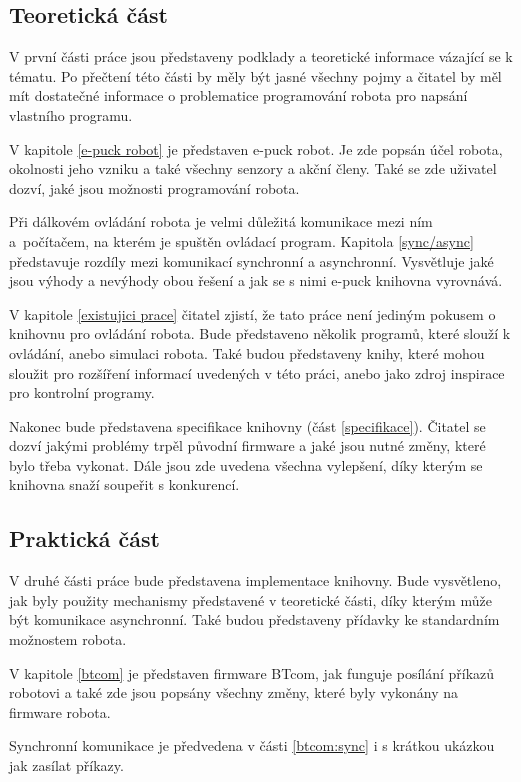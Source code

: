 \subsection*{Teoretická část}
V první části práce jsou představeny podklady a teoretické informace
vázající se k tématu. Po přečtení této části by měly být jasné všechny
pojmy a čitatel by měl mít dostatečné informace o problematice programování
robota pro napsání vlastního programu.

V kapitole \ref{e-puck robot} je představen e-puck robot. Je zde popsán
účel robota, okolnosti jeho vzniku a také všechny senzory a akční členy.
Také se zde uživatel dozví, jaké jsou možnosti programování robota.

Při dálkovém ovládání robota je velmi důležitá komunikace mezi ním a~počítačem,
na kterém je spuštěn ovládací program. Kapitola \ref{sync/async} představuje
rozdíly mezi komunikací synchronní a asynchronní. Vysvětluje jaké jsou výhody a
nevýhody obou řešení a jak se s nimi e-puck knihovna vyrovnává.

V kapitole \ref{existujici prace} čitatel zjistí, že tato práce není jediným
pokusem o knihovnu pro ovládání robota. Bude představeno několik programů,
které slouží k ovládání, anebo simulaci robota. Také budou představeny knihy,
které mohou sloužit pro rozšíření informací uvedených v této práci, anebo jako
zdroj inspirace pro kontrolní programy.

Nakonec bude představena specifikace knihovny (část \ref{specifikace}).
Čitatel se dozví jakými problémy trpěl původní firmware a jaké jsou nutné
změny, které bylo třeba vykonat. Dále jsou zde uvedena všechna vylepšení,
díky kterým se knihovna snaží soupeřit s konkurencí.

\subsection*{Praktická část}
V druhé části práce bude představena implementace knihovny. Bude
vysvětleno, jak byly použity mechanismy představené v teoretické části,
díky kterým může být komunikace asynchronní. Také budou představeny
přídavky ke standardním možnostem robota.

V kapitole \ref{btcom} je představen firmware BTcom, jak funguje posílání
příkazů robotovi a také zde jsou popsány všechny změny, které byly vykonány
na firmware robota.

Synchronní komunikace je předvedena v části \ref{btcom:sync} i s krátkou
ukázkou jak zasílat příkazy.

